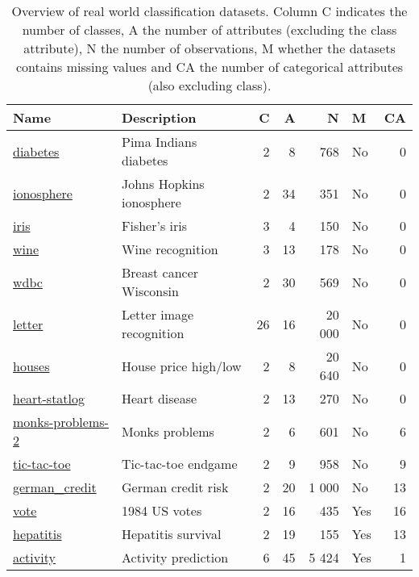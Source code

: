 \begin{table}
\centering
\begin{tabular}[htp]{ l l r r r l r }
    Name & Description & C & A & N & M & CA \\ \hline
    \href{https://www.openml.org/d/37}{diabetes} & Pima Indians diabetes & 2 & 8 & 768 & No & 0 \\
    \href{https://www.openml.org/d/59}{ionosphere} & Johns Hopkins ionosphere & 2 & 34 & 351 & No & 0 \\
    \href{https://www.openml.org/d/61}{iris} & Fisher's iris & 3 & 4 & 150 & No & 0 \\
    \href{https://www.openml.org/d/187}{wine} & Wine recognition & 3 & 13 & 178 & No & 0 \\
    \href{https://www.openml.org/d/1510}{wdbc} & Breast cancer Wisconsin & 2 & 30 & 569 & No & 0 \\
    \href{https://www.openml.org/d/6}{letter} & Letter image recognition & 26 & 16 & 20 000 & No & 0 \\
    \href{https://www.openml.org/d/823}{houses} & House price high/low & 2 & 8 & 20 640 & No & 0 \\
    \href{https://www.openml.org/d/53}{heart-statlog} & Heart disease & 2 & 13 & 270 & No & 0 \\
    \href{https://www.openml.org/d/334}{monks-problems-2} & Monks problems & 2 & 6 & 601 & No & 6 \\
    \href{https://www.openml.org/d/50}{tic-tac-toe} & Tic-tac-toe endgame & 2 & 9 & 958 & No & 9 \\
    \href{https://www.openml.org/d/31}{german\_credit} & German credit risk & 2 & 20 & 1 000 & No & 13 \\
    \href{https://www.openml.org/d/56}{vote} & 1984 US votes & 2 & 16 & 435 & Yes & 16 \\
    \href{https://www.openml.org/d/55}{hepatitis} & Hepatitis survival & 2 & 19 & 155 & Yes & 13 \\
    \href{http://www.cis.fordham.edu/wisdm/dataset.php}{activity} & Activity prediction & 6 & 45 & 5 424 & Yes & 1 \\
\end{tabular}
\caption{Overview of real world classification datasets. Column C indicates the number of classes, A the number of attributes (excluding the class attribute), N the number of observations, M whether the datasets contains missing values and CA the number of categorical attributes (also excluding class).}%
\label{tbl:datasets}
\end{table}

